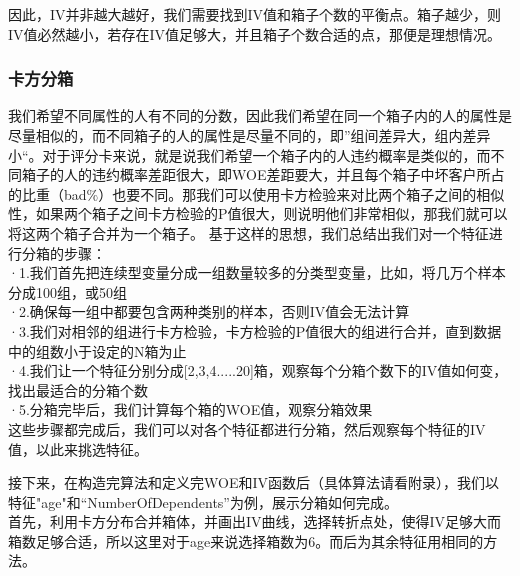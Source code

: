 \documentclass[12pt]{article}
\begin{document}
\begin{flushleft}
	\noindent\qquad 因此，IV并非越大越好，我们需要找到IV值和箱子个数的平衡点。箱子越少，则IV值必然越小，若存在IV值足够大，并且箱子个数合适的点，那便是理想情况。
\end{flushleft}

\newpage
\subsubsection{卡方分箱}

\begin{flushleft}
	\noindent\qquad 我们希望不同属性的人有不同的分数，因此我们希望在同一个箱子内的人的属性是尽量相似的，而不同箱子的人的属性是尽量不同的，即”组间差异大，组内差异小“。对于评分卡来说，就是说我们希望一个箱子内的人违约概率是类似的，而不同箱子的人的违约概率差距很大，即WOE差距要大，并且每个箱子中坏客户所占的比重（bad$\%$）也要不同。那我们可以使用卡方检验来对比两个箱子之间的相似性，如果两个箱子之间卡方检验的P值很大，则说明他们非常相似，那我们就可以将这两个箱子合并为一个箱子。
	基于这样的思想，我们总结出我们对一个特征进行分箱的步骤：\\
	\vspace{1cm}
	\noindent\qquad·1.我们首先把连续型变量分成一组数量较多的分类型变量，比如，将几万个样本分成100组，或50组\\
	\noindent\qquad·2.确保每一组中都要包含两种类别的样本，否则IV值会无法计算\\
	\noindent\qquad·3.我们对相邻的组进行卡方检验，卡方检验的P值很大的组进行合并，直到数据中的组数小于设定的N箱为止\\
	\noindent\qquad·4.我们让一个特征分别分成[2,3,4.....20]箱，观察每个分箱个数下的IV值如何变，找出最适合的分箱个数\\
	\noindent\qquad·5.分箱完毕后，我们计算每个箱的WOE值，观察分箱效果\\

	\noindent\qquad 这些步骤都完成后，我们可以对各个特征都进行分箱，然后观察每个特征的IV值，以此来挑选特征。
	
	\noindent\qquad 接下来，在构造完算法和定义完WOE和IV函数后（具体算法请看附录），我们以特征"age"和“NumberOfDependents”为例，展示分箱如何完成。\\
	\noindent\qquad 首先，利用卡方分布合并箱体，并画出IV曲线，选择转折点处，使得IV足够大而箱数足够合适，所以这里对于age来说选择箱数为6。而后为其余特征用相同的方法。
	
\end{flushleft}
\end{document}
